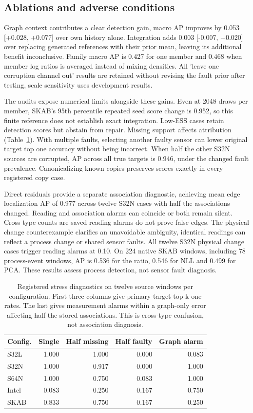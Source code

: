 \documentclass{llncs}
\newcommand{\1}{\mathbf{1}}
\begin{document}
\subsection{Ablations and adverse conditions}
Graph context contributes a clear detection gain, macro AP improves by 0.053 [+0.028, +0.077] over own history alone. Integration adds 0.003 [-0.007, +0.020] over replacing generated references with their prior mean, leaving its additional benefit inconclusive. Family macro AP is 0.427 for one member and 0.468 when member log ratios is averaged instead of mixing densities. All 'leave one corruption channel out' results are retained without revising the fault prior after testing, scale sensitivity uses development results.

The audits expose numerical limits alongside these gains. Even at 2048 draws per member, SKAB's 95th percentile repeated seed score change is 0.952, so this finite reference does not establish exact integration. Low-ESS cases retain detection scores but abstain from repair. Missing support affects attribution (Table~\ref{tab:stress}). With multiple faults, selecting another faulty sensor can lower original target top one accuracy without being incorrect. When half the other S32N sources are corrupted, AP across all true targets is 0.946, under the changed fault prevalence. Canonicalizing known copies preserves scores exactly in every registered copy case.

Direct residuals provide a separate association diagnostic, achieving mean edge localization AP of 0.977 across twelve S32N cases with half the associations changed. Reading and association alarms can coincide or both remain silent. Cross type counts are saved reading alarms do not prove false edges. The physical change counterexample clarifies an unavoidable ambiguity, identical readings can reflect a process change or shared sensor faults. All twelve S32N physical change cases trigger reading alarms at 0.10. On 224 native SKAB windows, including 78 process-event windows, AP is 0.536 for the ratio, 0.546 for NLL and 0.499 for PCA. These results assess process detection, not sensor fault diagnosis.

\begin{table}[!tbp]
\centering
\caption{Registered stress diagnostics on twelve source windows per configuration. First three columns give primary-target top k-one rates. The last gives measurement alarms within a graph-only error affecting half the stored associations. This is cross-type confusion, not association diagnosis.}
\label{tab:stress}
\small
\begin{tabular}{lrrrr}
\toprule
Config. & Single & Half missing & Half faulty & Graph alarm \\
\midrule
S32L & 1.000 & 1.000 & 0.000 & 0.083 \\
S32N & 1.000 & 0.917 & 0.000 & 1.000 \\
S64N & 1.000 & 0.750 & 0.083 & 1.000 \\
Intel & 0.083 & 0.250 & 0.167 & 0.750 \\
SKAB & 0.833 & 0.750 & 0.167 & 0.250 \\
\bottomrule
\end{tabular}
\end{table}
\end{document}
